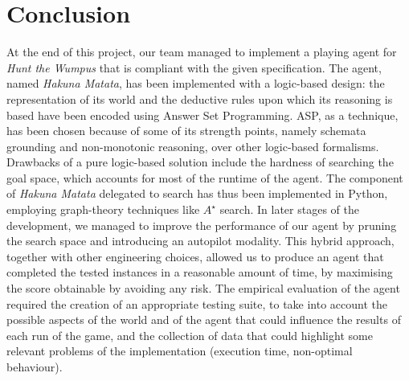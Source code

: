 \documentclass{llncs}
\newcommand{\htw}{\emph{Hunt the Wumpus}\xspace}
\newcommand{\hm}{\emph{Hakuna Matata}\xspace}
\begin{document}

\section{Conclusion}

At the end of this project, our team managed to implement a playing agent for \htw that is compliant with the given specification.
The agent, named \hm, has been implemented with a logic-based design: the representation of its world and the deductive rules upon which its reasoning is based have been encoded using Answer Set Programming.
ASP, as a technique, has been chosen because of some of its strength points, namely schemata grounding and non-monotonic reasoning, over other logic-based formalisms.
Drawbacks of a pure logic-based solution include the hardness of searching the goal space, which accounts for most of the runtime of the agent.
The component of \hm delegated to search has thus been implemented in Python, employing graph-theory techniques like $A^{\star}$ search.
In later stages of the development, we managed to improve the performance of our agent by pruning the search space and introducing an autopilot modality.
This hybrid approach, together with other engineering choices, allowed us to produce an agent that completed the tested instances in a reasonable amount of time, by maximising the score obtainable by avoiding any risk.
The empirical evaluation of the agent required the creation of an appropriate testing suite, to take into account the possible aspects of the world and of the agent that could influence the results of each run of the game, and the collection of data that could highlight some relevant problems of the implementation (execution time, non-optimal behaviour).
\end{document}
